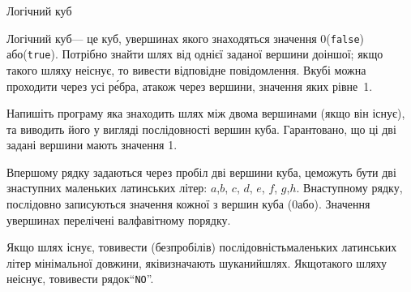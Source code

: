 \documentclass[14pt,a4paper]{extarticle}
\begin{document}
\begin{problemAllDefault}{Логічний куб}

Логічний куб\nolinebreak[3] --- це куб, у\nolinebreak[3] вершинах якого знаходяться значення 0\nolinebreak[3] (\texttt{false}) або\nolinebreak[3] (\texttt{true}). Потрібно знайти шлях від однієї заданої вершини до\nolinebreak[2] іншої; якщо такого шляху не\nolinebreak[3] існує, то вивести відповідне повідомлення. В\nolinebreak[3] кубі можна проходити через усі р\'{е}бра, а\nolinebreak[3] також через вершини, значення яких рівне~1.

Напишіть програму яка знаходить шлях між двома вершинами (якщо він існує), та виводить його у вигляді послідовності вершин куба. Гарантовано, що ці дві задані вершини мають значення 1.

\InputFile
В\nolinebreak[3] першому рядку задаються через пробіл дві вершини куба, це\nolinebreak[1] можуть бути дві з\nolinebreak[3] наступних маленьких латинських літер: $a$,\nolinebreak[3] $b$, $c$, $d$, $e$, $f$, $g$,\nolinebreak[3] $h$. В\nolinebreak[3] наступному рядку, послідовно записуються значення кожної з вершин куба (0\nolinebreak[2] або). Значення у\nolinebreak[2] вершинах перелічені в\nolinebreak[2] алфавітному порядку.

\OutputFile\label{text:log-cude-as-example-of-non-unique-correct-answer}
Якщо шлях існує, то\nolinebreak[2] вивести (без\nolinebreak[2] пробілів) послідовність\linebreak[1] маленьких латинських літер мінімальної довжини, які\nolinebreak[2] визначають шуканий\nolinebreak[2] шлях. Якщо\nolinebreak[2] такого шляху не\nolinebreak[3] існує, то\nolinebreak[2] вивести рядок\nolinebreak[3] ``\texttt{NO}''.

\Examples
\begin{exampleSimple}{3em}{3em}%
%
%
\end{exampleSimple}

\end{problemAllDefault}
\end{document}
